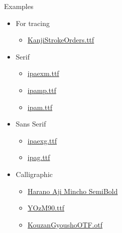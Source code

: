 \documentclass[letterpaper]{article}
\begin{document}
	
	\vfill\eject\pagebreak
	
	\vspace*{2cm}
	
	{\LARGE Examples}
	
	\vspace*{1cm}
	
	
	
	\begin{itemize}
		\item[] {\LARGE For tracing}
		\begin{itemize}
			\item[] \href{https://gwmatthews.github.io/the-four-vows-stroke-order.pdf}{KanjiStrokeOrders.ttf}
		\end{itemize}
	\end{itemize}
	
	\vspace*{1cm}
	
	\begin{itemize}
		\item[] {\LARGE Serif}
		\begin{itemize}
			\item[] \href{https://gwmatthews.github.io/the-four-vows-ipaexm.pdf}{ipaexm.ttf}
			\item[] \href{https://gwmatthews.github.io/the-four-vows-ipamp.pdf}{ipamp.ttf}
			\item[] 
			\href{https://gwmatthews.github.io/the-four-vows-ipam.pdf}{ipam.ttf}
		\end{itemize}
	\end{itemize}
	
	\vspace*{1cm}
	
	\begin{itemize}
		\item[] {\LARGE Sans Serif}
		\begin{itemize}
			\item[] \href{https://gwmatthews.github.io/the-four-vows-ipaexg.pdf}{ipaexg.ttf}
			\item[] 
			\href{https://gwmatthews.github.io/the-four-vows-ipag.pdf}{ipag.ttf}
		\end{itemize}
	\end{itemize}

\vspace*{1cm}

\begin{itemize}
	\item[] {\LARGE Calligraphic}
	\begin{itemize}
		\item[] \href{https://gwmatthews.github.io/the-four-vows-HaranoAjiMinchoSB.pdf}{Harano Aji Mincho SemiBold}
		\item[] \href{https://gwmatthews.github.io/the-four-vows-YOzM90.pdf}{YOzM90.ttf}
		\item[] \href{https://gwmatthews.github.io/the-four-vows-KouzanGyousho.pdf}{KouzanGyoushoOTF.otf}
	\end{itemize}
\end{itemize}
\vspace*{1cm}
\end{document}
